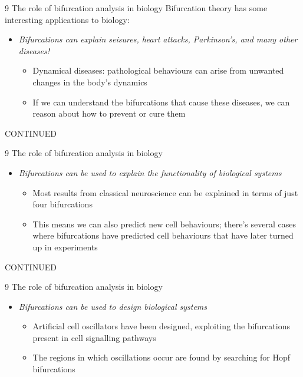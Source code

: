 \documentclass[presentation]{beamer}
\begin{document}
\begin{frame}[label={sec:orgdcdd20c}]{9 The role of bifurcation analysis in biology}
Bifurcation theory has some interesting applications to biology:

\begin{itemize}
\item \emph{Bifurcations can explain seisures, heart attacks, Parkinson's, and many other diseases!}
\begin{itemize}
\item Dynamical diseases: pathological behaviours can arise from unwanted changes in the body's dynamics
\item If we can understand the bifurcations that cause these diseases, we can reason about how to prevent or cure them

\vfill
\end{itemize}
\end{itemize}
CONTINUED 
\end{frame}
\begin{frame}[label={sec:org8328038}]{9 The role of bifurcation analysis in biology}
\begin{itemize}
\item \emph{Bifurcations can be used to explain the functionality of biological systems}
\begin{itemize}
\item Most results from classical neuroscience can be explained in terms of just four bifurcations
\item This means we can also predict new cell behaviours; there's several cases where bifurcations have predicted cell behaviours that have later turned up in experiments

\vfill
\end{itemize}
\end{itemize}
CONTINUED 
\end{frame}
\begin{frame}[label={sec:orgfc40892}]{9 The role of bifurcation analysis in biology}
\begin{itemize}
\item \emph{Bifurcations can be used to design biological systems}
\begin{itemize}
\item Artificial cell oscillators have been designed, exploiting the bifurcations present in cell signalling pathways
\item The regions in which oscillations occur are found by searching for Hopf bifurcations
\end{itemize}
\end{itemize}
\end{frame}
\end{document}
